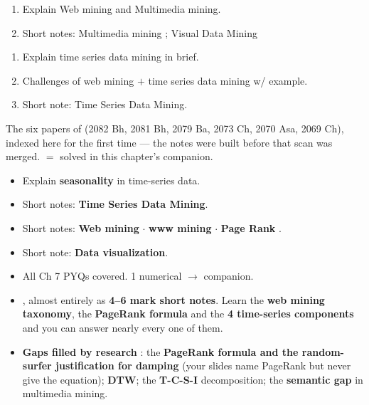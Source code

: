 \begin{enumerate}[start=6]
  \item {} Explain Web mining and Multimedia mining. \hfill {} 
  \item {} Short notes: Multimedia mining \hfill {} ;
        Visual Data Mining \hfill {} 
\end{enumerate}

\begin{enumerate}[start=8]
  \item {} Explain time series data mining in brief. \hfill {} 
  \item {} Challenges of web mining $+$ time series data mining w/ example. \hfill {} 
  \item {} Short note: Time Series Data Mining.
        \hfill {}      
\end{enumerate}

{\color{sub}\footnotesize The six papers of  (2082 Bh, 2081 Bh, 2079 Ba, 2073 Ch, 2070 Asa, 2069 Ch), indexed here for the
first time --- the notes were built before that scan was merged.  $=$ solved in this chapter's companion. \added}
\begin{itemize}
  \item Explain \textbf{seasonality} in time-series data. \hfill {} 
  \item Short notes: \textbf{Time Series Data Mining}. \hfill {} 
  \item Short notes: \textbf{Web mining}  $\cdot$ \textbf{www mining}  $\cdot$ \textbf{Page Rank} . \hfill {}
  \item Short note: \textbf{Data visualization}. \hfill {} 
\end{itemize}

\begin{itemize}
  \item All Ch 7 PYQs covered. 1 numerical  $\rightarrow$ companion.
  \item {}, almost entirely as
        \textbf{4--6 mark short notes}. Learn the \textbf{web mining taxonomy}, the
        \textbf{PageRank formula} and the \textbf{4 time-series components} and you can answer
        nearly every one of them.
  \item \textbf{Gaps filled by research} \added: the \textbf{PageRank formula and the random-surfer
        justification for damping} (your slides name PageRank but never give the equation);
        \textbf{DTW}; the \textbf{T-C-S-I} decomposition; the \textbf{semantic gap} in multimedia mining.
\end{itemize}

